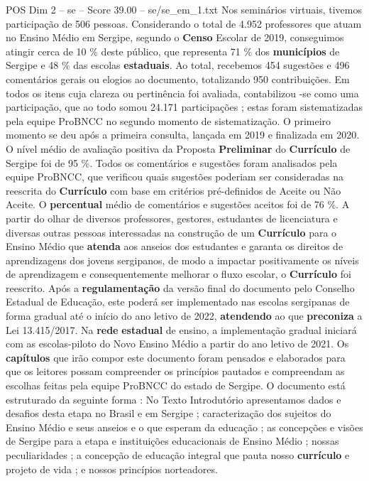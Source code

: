 \begin{textsample}{POS Dim 2 – se – Score 39.00 – se/se\_em\_1.txt}
Nos seminários virtuais, tivemos participação de 506 pessoas.
Considerando o total de 4.952 professores que atuam no Ensino Médio em Sergipe, segundo o \textbf{Censo} Escolar de 2019, conseguimos atingir cerca de 10 \% deste público, que representa 71 \% dos \textbf{municípios} de Sergipe e 48 \% das escolas \textbf{estaduais}.
Ao total, recebemos 454 sugestões e 496 comentários gerais ou elogios ao documento, totalizando 950 contribuições.
Em todos os itens cuja clareza ou pertinência foi avaliada, contabilizou -se como uma participação, que ao todo somou 24.171 participações ; estas foram sistematizadas pela equipe ProBNCC no segundo momento de sistematização.
O primeiro momento se deu após a primeira consulta, lançada em 2019 e finalizada em 2020.
O nível médio de avaliação positiva da Proposta \textbf{Preliminar} do \textbf{Currículo} de Sergipe foi de 95 \%.
Todos os comentários e sugestões foram analisados pela equipe ProBNCC, que verificou quais sugestões poderiam ser consideradas na reescrita do \textbf{Currículo} com base em critérios pré-definidos de Aceite ou Não Aceite.
O \textbf{percentual} médio de comentários e sugestões aceitos foi de 76 \%.
A partir do olhar de diversos professores, gestores, estudantes de licenciatura e diversas outras pessoas interessadas na construção de um \textbf{Currículo} para o Ensino Médio que \textbf{atenda} aos anseios dos estudantes e garanta os direitos de aprendizagens dos jovens sergipanos, de modo a impactar positivamente os níveis de aprendizagem e consequentemente melhorar o fluxo escolar, o \textbf{Currículo} foi reescrito.
Após a \textbf{regulamentação} da versão final do documento pelo Conselho Estadual de Educação, este poderá ser implementado nas escolas sergipanas de forma gradual até o início do ano letivo de 2022, \textbf{atendendo} ao que \textbf{preconiza} a Lei 13.415/2017.
Na \textbf{rede} \textbf{estadual} de ensino, a implementação gradual iniciará com as escolas-piloto do Novo Ensino Médio a partir do ano letivo de 2021.
Os \textbf{capítulos} que irão compor este documento foram pensados e elaborados para que os leitores possam compreender os princípios pautados e compreendam as escolhas feitas pela equipe ProBNCC do estado de Sergipe.
O documento está estruturado da seguinte forma : No Texto Introdutório apresentamos dados e desafios desta etapa no Brasil e em Sergipe ; caracterização dos sujeitos do Ensino Médio e seus anseios e o que esperam da educação ; as concepções e visões de Sergipe para a etapa e instituições educacionais de Ensino Médio ; nossas peculiaridades ; a concepção de educação integral que pauta nosso \textbf{currículo} e projeto de vida ; e nossos princípios norteadores.

\end{textsample}
